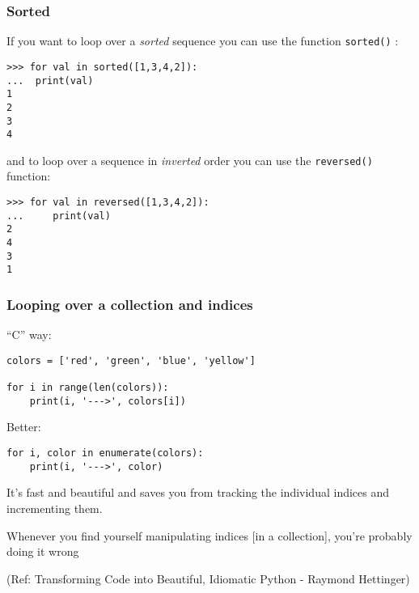\begin{frame}[fragile]\frametitle{Sorted}

  If you want to loop over a \textit{sorted} sequence you can use the
  function \texttt{sorted()} :

  \begin{lstlisting}
>>> for val in sorted([1,3,4,2]):
...  print(val)
1
2
3
4
  \end{lstlisting}

and to loop over a sequence in \textit{inverted} order you can use the
\texttt{reversed()} function:

\begin{lstlisting}
>>> for val in reversed([1,3,4,2]):
...     print(val)
2
4
3
1
\end{lstlisting}

\end{frame}

\begin{frame}[fragile]\frametitle{Looping over a collection and indices}
``C'' way:
\begin{lstlisting}
colors = ['red', 'green', 'blue', 'yellow']

for i in range(len(colors)):
    print(i, '--->', colors[i])
\end{lstlisting}
Better:
\begin{lstlisting}
for i, color in enumerate(colors):
    print(i, '--->', color)
\end{lstlisting}

It's fast and beautiful and saves you from tracking the individual indices and incrementing them.

Whenever you find yourself manipulating indices [in a collection], you're probably doing it wrong


\tiny{(Ref: Transforming Code into Beautiful, Idiomatic Python -  Raymond Hettinger)}
\end{frame}

